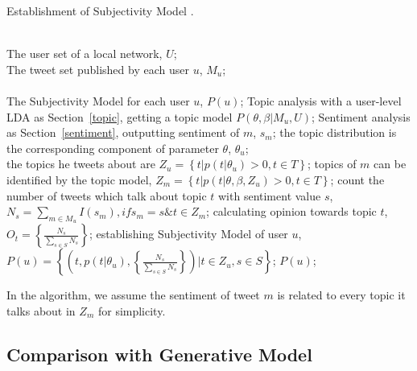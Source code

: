 \documentclass[runningheads,a4paper]{llncs}
\begin{document}
\begin{algorithm}[htb] 
\caption{ Establishment of Subjectivity Model .} 
\label{alg1}
\begin{algorithmic}[1] %
\REQUIRE ~~\\ %
The user set of a local network, $ U $;\\
The tweet set published by each user $ u $, $ M_{u} $;\\
\ENSURE ~~\\ %
The Subjectivity Model for each user $ u $, $ P(u) $;
\STATE Topic analysis with a user-level LDA as Section~\ref{topic}, getting a topic model $P(\theta,\beta|M_{u},U)$; 
\label{ alg1:topic }%
\label{alg1:sentiment}
\STATE Sentiment analysis as Section~\ref{sentiment}, outputting sentiment of $ m $, $ s_{m} $;
\ENDFOR
{}
\STATE the topic distribution is the corresponding component of parameter $ \theta $, $ \theta_{u} $; \\
\STATE the topics he tweets about are $ Z_{u}= \left\lbrace t \vert p\left( t \vert \theta_{u} \right)>0, t \in T \right\rbrace $; 
\ENDFOR
{}
\STATE topics of $ m $ can be identified by the topic model, $ Z_{m} =\left\lbrace t \vert p\left( t \vert \theta, \beta, Z_{u} \right)>0, t \in T \right\rbrace $; 
\ENDFOR
{}
\STATE count the number of tweets which talk about topic $ t $ with sentiment value $ s $, $ N_{s}=\sum_{m \in M_{u}} I\left( s_{m} \right) ,  if  s_{m}=s \& t \in Z_{m} $; 
\ENDFOR
\STATE calculating opinion towards topic $ t $, $  O_{t} = \left\{ \frac{N_{s}}{\sum_{s \in S} N_{s}} \right\} $;
\ENDFOR
\STATE establishing Subjectivity Model of user $ u $, $ P\left( u \right)= \left\lbrace \left( t, p\left( t \vert \theta_{u} \right), \left\{ \frac{N_{s}}{\sum_{s \in S} N_{s}} \right\}  \right)  \vert t \in Z_{u}, s \in S  \right\rbrace   $;
\label{subuser}
\RETURN $P(u)$; %
\end{algorithmic}
\end{algorithm}
In the algorithm,  we assume the sentiment of tweet $ m $ is related to every topic it talks about in $ Z_{m} $ for simplicity.

\subsection{Comparison with Generative Model}
\label{comparison}
\end{document}
